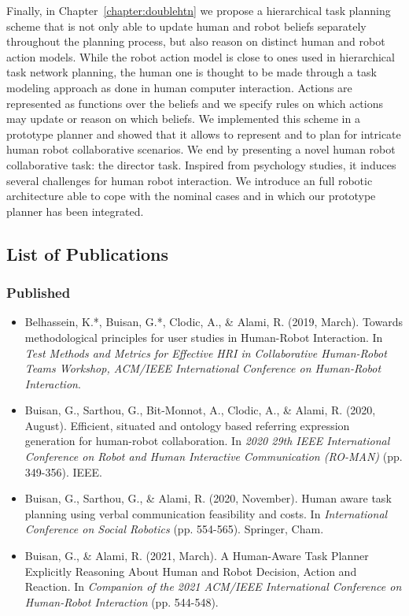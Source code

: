 \documentclass[a4paper,11pt,twoside]{StyleThese}
\begin{document}
Finally, in Chapter~\ref{chapter:doublehtn} we propose a hierarchical task planning scheme that is not only able to update human and robot beliefs separately throughout the planning process, but also reason on distinct human and robot action models. While the robot action model is close to ones used in hierarchical task network planning, the human one is thought to be made through a task modeling approach as done in human computer interaction. Actions are represented as functions over the beliefs and we specify rules on which actions may update or reason on which beliefs. We implemented this scheme in a prototype planner and showed that it allows to represent and to plan for intricate human robot collaborative scenarios. We end by presenting a novel human robot collaborative task: the director task. Inspired from psychology studies, it induces several challenges for human robot interaction. We introduce an full robotic architecture able to cope with the nominal cases and in which our prototype planner has been integrated.

\subsection*{List of Publications}
\subsubsection*{Published}
\begin{itemize}
\item Belhassein, K.*, Buisan, G.*, Clodic, A., \& Alami, R. (2019, March). Towards methodological principles for user studies in Human-Robot Interaction. In \textit{Test Methods and Metrics for Effective HRI in Collaborative Human-Robot Teams Workshop, ACM/IEEE International Conference on Human-Robot Interaction}.

\item Buisan, G., Sarthou, G., Bit-Monnot, A., Clodic, A., \& Alami, R. (2020, August). Efficient, situated and ontology based referring expression generation for human-robot collaboration. In \textit{2020 29th IEEE International Conference on Robot and Human Interactive Communication (RO-MAN)} (pp. 349-356). IEEE.

\item Buisan, G., Sarthou, G., \& Alami, R. (2020, November). Human aware task planning using verbal communication feasibility and costs. In \textit{International Conference on Social Robotics} (pp. 554-565). Springer, Cham.

\item Buisan, G., \& Alami, R. (2021, March). A Human-Aware Task Planner Explicitly Reasoning About Human and Robot Decision, Action and Reaction. In \textit{Companion of the 2021 ACM/IEEE International Conference on Human-Robot Interaction} (pp. 544-548).
\end{itemize}
\end{document}

